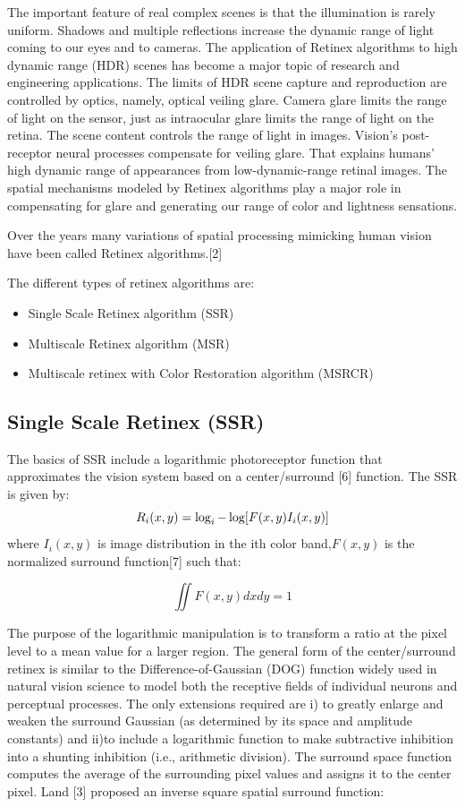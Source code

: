 The important feature of real complex scenes is that the illumination is rarely uniform. Shadows and multiple reflections increase the dynamic range of light coming to our eyes and to cameras. The application of Retinex algorithms to high dynamic range (HDR) scenes has become a major topic of research and engineering applications. The limits of HDR scene capture and reproduction are controlled by optics, namely, optical veiling glare. Camera glare limits the range of light on the sensor, just as intraocular glare limits the range of light on the retina. The scene content controls the range of light in images. Vision’s post-receptor neural processes compensate for veiling glare. That explains humans’ high dynamic range of appearances from low-dynamic-range retinal images. The spatial mechanisms modeled by Retinex algorithms play a major role in compensating for glare and generating our range of color and lightness sensations.

Over the years many variations of spatial processing mimicking human vision have been called Retinex algorithms.[2]

The different types of retinex algorithms are: 
\begin{itemize}
		\item Single Scale Retinex algorithm (SSR)
		\item Multiscale Retinex algorithm (MSR)
		\item Multiscale retinex with Color Restoration algorithm (MSRCR) 
\end{itemize}
	
\subsection{Single Scale Retinex (SSR)}
The basics of SSR include a logarithmic photoreceptor function that approximates the vision system based on a center/surround [6] function. The SSR is given by:
\begin{equation}
	R_{i}(x,y)=\log_{i}-\log[F(x,y)\*I_{i}(x,y)]
\end{equation}
where $I_{i} (x,y)$ is image distribution in the ith color band,$F(x,y)$ is the normalized surround function[7] such that:

\begin{equation}
	\iint F(x,y)dxdy=1
\end{equation}

The purpose of the logarithmic manipulation is to transform a ratio at the pixel level to a mean value for a
larger region. The general form of the center/surround retinex is similar to the Difference-of-Gaussian (DOG)
function widely used in natural vision science to model both the receptive fields of individual neurons and
perceptual processes. The only extensions required are i) to greatly enlarge and weaken the surround Gaussian (as
determined by its space and amplitude constants) and ii)to include a logarithmic function to make subtractive
inhibition into a shunting inhibition (i.e., arithmetic division). The surround space function computes the
average of the surrounding pixel values and assigns it to the center pixel.
Land [3] proposed an inverse square spatial surround function:

